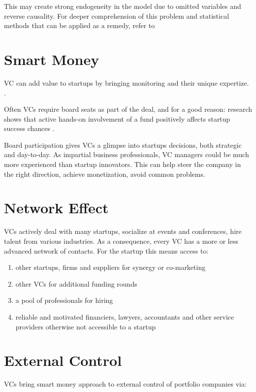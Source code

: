     This may create strong endogeneity in the model due to omitted variables and reverse causality. For deeper comprehension of this problem and statistical methods that can be applied as a remedy, refer to \parencite[pp. 137 - 140]{verbeek:2008}


\section{Smart Money}
    VC can add value to startups by bringing monitoring and their unique expertize. \parencite{lerner:2004}.
    
    Often VCs require board seats as part of the deal, and for a good reason: research shows that active hands-on involvement of a fund positively affects startup success chances \parencite{vc_monitoring}.
        
    Board participation gives VCs a glimpse into startups decisions, both strategic and day-to-day. As impartial business professionals, VC managers could be much more experienced than startup innovators. This can help steer the company in the right direction, achieve monetization, avoid common problems.
    
\section{Network Effect}
    VCs actively deal with many startups, socialize at events and conferences, hire talent from various industries. As a consequence, every VC has a more or less advanced network of contacts.
    For the startup this means access to:
    \begin{enumerate}
        \item other startups, firms and suppliers for synergy or co-marketing
        \item other VCs for additional funding rounds
        \item a pool of professionals for hiring
        \item reliable and motivated financiers, lawyers, accountants and other service providers otherwise not accessible to a startup
    \end{enumerate}


\section{External Control}
    VCs bring smart money approach to external control of portfolio companies via:
    
